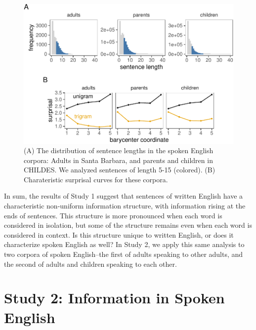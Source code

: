 \documentclass[10pt, letterpaper]{article}
\newenvironment{CodeChunk}{}{}
\begin{document}
\begin{CodeChunk}
\begin{figure}[tb]

{\centering \includegraphics{figs/spoken_figs-1} 

}

\caption[(A) The distribution of sentence lengths in the spoken English corpora]{(A) The distribution of sentence lengths in the spoken English corpora: Adults in Santa Barbara, and parents and children in CHILDES. We analyzed sentences of length 5-15 (colored). (B) Charateristic surprisal curves for these corpora.}\label{fig:spoken_figs}
\end{figure}
\end{CodeChunk}

In sum, the results of Study 1 suggest that sentences of written English
have a characteristic non-uniform information structure, with
information rising at the ends of sentences. This structure is more
pronounced when each word is considered in isolation, but some of the
structure remains even when each word is considered in context. Is this
structure unique to written English, or does it characterize spoken
English as well? In Study 2, we apply this same analysis to two corpora
of spoken English--the first of adults speaking to other adults, and the
second of adults and children speaking to each other.

\hypertarget{study-2-information-in-spoken-english}{%
\section{Study 2: Information in Spoken
English}\label{study-2-information-in-spoken-english}}
\end{document}
